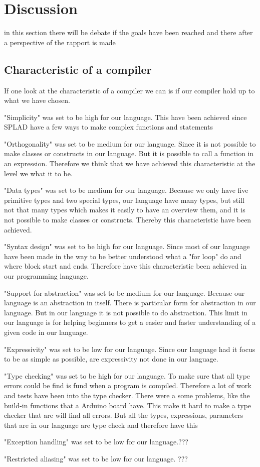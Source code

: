 \section{Discussion}
\label{sec:discussion}
in this section there will be debate if the goals have been reached and there after a perspective of the rapport is made

\subsection{Characteristic of a compiler}
If one look at the characteristic of a compiler we can is if our compiler hold up to what we have chosen.

"Simplicity" was set to be high for our language. This have been achieved since SPLAD have a few ways to make complex functions and statements

"Orthogonality" was set to be medium for our language. Since it is  not possible to make classes or constructs in our language. But it is possible to call a function in an expression. Therefore we think that we have achieved this characteristic  at the level we what it to be.

"Data types" was set to be medium for our language. Because we only have five primitive types and two special types, our language have many types, but still not that many types which makes it easily to have an overview them, and it is not possible to make classes or constructs. Thereby this characteristic  have been achieved.

"Syntax design" was set to be high for our language. Since most of our language have been made in the way to be better understood what a "for loop" do and where block start and ends. Therefore have this characteristic  been achieved in our programming language.

"Support for abstraction" was set to be medium for our language. Because our language is an abstraction in itself. There is particular form for abstraction in our language. But in our language it is not possible to do abstraction. This limit in our language is for helping beginners to get a easier and faster understanding of a given code in our language.

"Expressivity" was set to be low for our language. Since our language had it focus to be as simple as possible, are expressivity not done in our language. %


"Type checking" was set to be high for our language. To make sure that all type errors could be find is fund when a program is compiled. Therefore a lot of work and tests have been into the type checker. There were a some problems, like the build-in functions that a Arduino board have. This make it hard to make a type checker that are will find all errors. But all the types, expressions, parameters that are in our language are type check and therefore have this 

"Exception handling" was set to be low for our language.???

"Restricted aliasing" was set to be low for our language. ???

